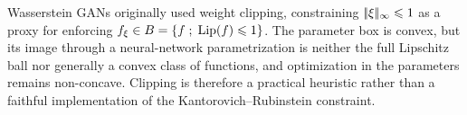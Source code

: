 \begin{rem}
	Wasserstein GANs originally used weight clipping, constraining $|\!| \xi |\!|_\infty \leqslant 1$ as a proxy for enforcing $f_\xi \in B = \left\{ f \;;\; \operatorname{Lip}(f) \leqslant 1 \right\}$. The parameter box is convex, but its image through a neural-network parametrization is neither the full Lipschitz ball nor generally a convex class of functions, and optimization in the parameters remains non-concave. Clipping is therefore a practical heuristic rather than a faithful implementation of the Kantorovich--Rubinstein constraint.
\end{rem}
